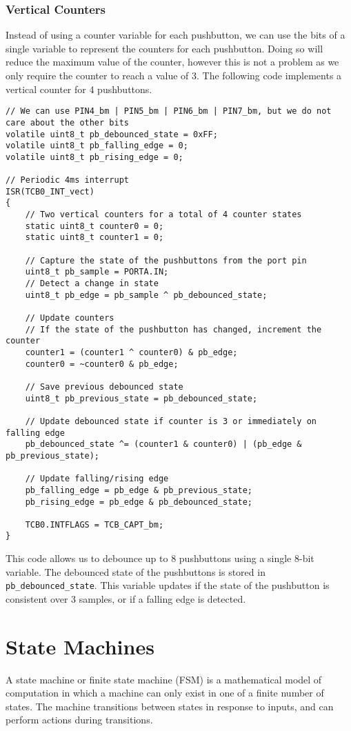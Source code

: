 \documentclass{report}
\begin{document}
\subsection{Vertical Counters}
Instead of using a counter variable for each pushbutton, we can use the
bits of a single variable to represent the counters for each
pushbutton. Doing so will reduce the maximum value of the counter,
however this is not a problem as we only require the counter to reach a
value of 3. The following code implements a vertical counter for 4
pushbuttons.
\begin{verbatim}
// We can use PIN4_bm | PIN5_bm | PIN6_bm | PIN7_bm, but we do not care about the other bits
volatile uint8_t pb_debounced_state = 0xFF;
volatile uint8_t pb_falling_edge = 0;
volatile uint8_t pb_rising_edge = 0;

// Periodic 4ms interrupt
ISR(TCB0_INT_vect)
{
    // Two vertical counters for a total of 4 counter states
    static uint8_t counter0 = 0;
    static uint8_t counter1 = 0;

    // Capture the state of the pushbuttons from the port pin
    uint8_t pb_sample = PORTA.IN;
    // Detect a change in state
    uint8_t pb_edge = pb_sample ^ pb_debounced_state;

    // Update counters
    // If the state of the pushbutton has changed, increment the counter
    counter1 = (counter1 ^ counter0) & pb_edge;
    counter0 = ~counter0 & pb_edge;

    // Save previous debounced state
    uint8_t pb_previous_state = pb_debounced_state;

    // Update debounced state if counter is 3 or immediately on falling edge
    pb_debounced_state ^= (counter1 & counter0) | (pb_edge & pb_previous_state);

    // Update falling/rising edge
    pb_falling_edge = pb_edge & pb_previous_state;
    pb_rising_edge = pb_edge & pb_debounced_state;

    TCB0.INTFLAGS = TCB_CAPT_bm;
}
\end{verbatim}
This code allows us to debounce up to 8 pushbuttons using a single
8-bit variable. The debounced state of the pushbuttons is stored in
\texttt{pb_debounced_state}. This variable updates if the state
of the pushbutton is consistent over 3 samples, or if a falling edge is
detected.
\chapter{State Machines}
A state machine or finite state machine (FSM) is a mathematical model
of computation in which a machine can only exist in one of a finite
number of states. The machine transitions between states in response to
inputs, and can perform actions during transitions.
\end{document}
